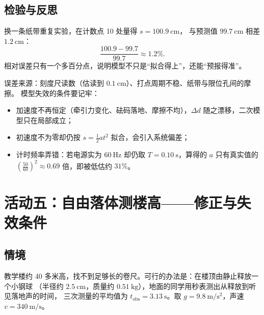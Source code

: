 \subsection{检验与反思}
换一条纸带重复实验，在计数点 10 处量得 $s=100.9\ \mathrm{cm}$，
与预测值 $99.7\ \mathrm{cm}$ 相差 $1.2\ \mathrm{cm}$：
\[
  \frac{100.9-99.7}{99.7}\approx1.2\%.
\]
相对误差只有一个多百分点，说明模型不只是“拟合得上”，还能“预报得准”。

误差来源：刻度尺读数（估读到 $0.1\ \mathrm{cm}$）、打点周期不稳、纸带与限位孔间的摩擦。
模型失效的条件要记牢：
\begin{itemize}
  \item 加速度不再恒定（牵引力变化、砝码落地、摩擦不均），$\Delta d$ 随之漂移，二次模型只在局部成立；
  \item 初速度不为零却仍按 $s=\tfrac12at^2$ 拟合，会引入系统偏差；
  \item 计时频率弄错：若电源实为 $60\ \mathrm{Hz}$ 却仍取 $T=0.10\ \mathrm{s}$，算得的 $a$ 只有真实值的
        $\left(\frac{50}{60}\right)^2\approx0.69$ 倍，即被低估约 $31\%$。
\end{itemize}

\section{活动五：自由落体测楼高——修正与失效条件}

\subsection{情境}
教学楼约 40 多米高，找不到足够长的卷尺。可行的办法是：在楼顶由静止释放一个小钢球
（半径约 $2.5\ \mathrm{cm}$，质量约 $0.51\ \mathrm{kg}$），地面的同学用秒表测出从释放到听见落地声的时间，
三次测量的平均值为 $t_{\text{obs}}=3.13\ \mathrm{s}$。取 $g=9.8\ \mathrm{m/s^2}$，声速 $v=340\ \mathrm{m/s}$。

\begin{center}
\end{center}

